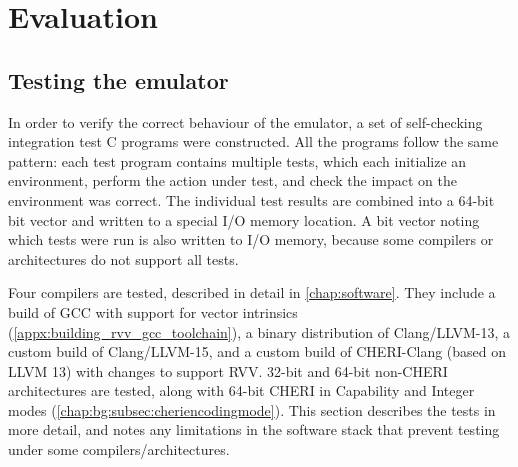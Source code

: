 \documentclass[../thesis]{subfiles}
\begin{document}
\chapter{Evaluation\label{chap:eval}}


\section{Testing the emulator}
In order to verify the correct behaviour of the emulator, a set of self-checking integration test C programs were constructed.
All the programs follow the same pattern: each test program contains multiple tests, which each initialize an environment, perform the action under test, and check the impact on the environment was correct.
The individual test results are combined into a 64-bit bit vector and written to a special I/O memory location.
A bit vector noting which tests were run is also written to I/O memory, because some compilers or architectures do not support all tests.

Four compilers are tested, described in detail in \cref{chap:software}.
They include a build of GCC with support for vector intrinsics (\cref{appx:building_rvv_gcc_toolchain}), a binary distribution of Clang/LLVM-13, a custom build of Clang/LLVM-15, and a custom build of CHERI-Clang (based on LLVM 13) with changes to support RVV.
32-bit and 64-bit non-CHERI architectures are tested, along with 64-bit CHERI in Capability and Integer modes (\cref{chap:bg:subsec:cheriencodingmode}).
This section describes the tests in more detail, and notes any limitations in the software stack that prevent testing under some compilers/architectures.

\end{document}

